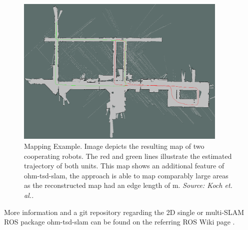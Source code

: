\begin{figure}[h!]
\begin{center}
\includegraphics[width=0.9\textwidth]{img/multislam_big.png}
\end{center}
\caption{Mapping Example. Image depicts the resulting map of two cooperating robots. The red and green lines illustrate the estimated trajectory of both units. This map shows an additional feature of ohm-tsd-slam, the approach is able to map comparably large areas as the reconstructed map had an edge length of \unit[122]{m}. \textit{Source: Koch et. al.\cite{Koch2015}.}}
\label{fig:slam_map_expl}
\end{figure}


More information and a git repository regarding the 2D single or multi-SLAM ROS package ohm-tsd-slam can be found on the referring ROS Wiki page \cite{ohmtsdslam:ros}.

